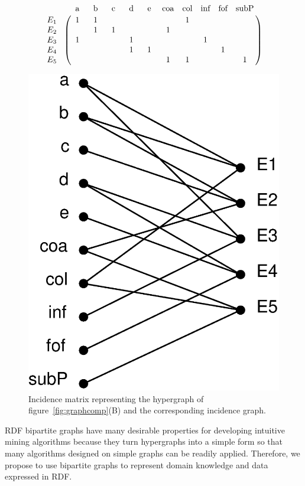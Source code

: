 \begin{figure}[tbh]
\centering
\begin{minipage}[c]{0.58\textwidth}\centering
\[ \bordermatrix{ ~       &  \text{~a~}  &  \text{~b~}  &  \text{~c~}  &  \text{~d~}  &  \text{~e~}  &   \text{coa} &   \text{col} &   \text{inf} &   \text{fof} &   \text{subP}\cr
                  E_1~~   &   1   &   1   &       &       &       &       &   1   &       &       &       \cr
                  E_2~~   &       &   1   &   1   &       &       &   1   &       &       &       &       \cr
                  E_3~~   &   1   &       &       &   1   &       &       &       &   1   &       &       \cr
                  E_4~~   &       &       &       &   1   &   1   &       &       &       &   1   &       \cr
                  E_5~~   &       &       &       &       &       &   1   &   1   &       &       &    1}
\]
\end{minipage}
\hfill
\begin{minipage}[c]{0.38\textwidth}\centering
\includegraphics[width=.7\textwidth]{fig/BG-black.eps}
\end{minipage}
\caption[An example incidence matrix of a hypergraph]{\label{fig:incidence}Incidence matrix representing the hypergraph of figure~\ref{fig:graphcomp}(B) and the corresponding incidence graph.}
\end{figure}

RDF bipartite graphs have many desirable properties for developing intuitive mining algorithms because they turn hypergraphs into a simple form so that many algorithms designed on simple graphs can be readily applied. Therefore, we propose to use bipartite graphs to represent domain knowledge and data expressed in RDF.

